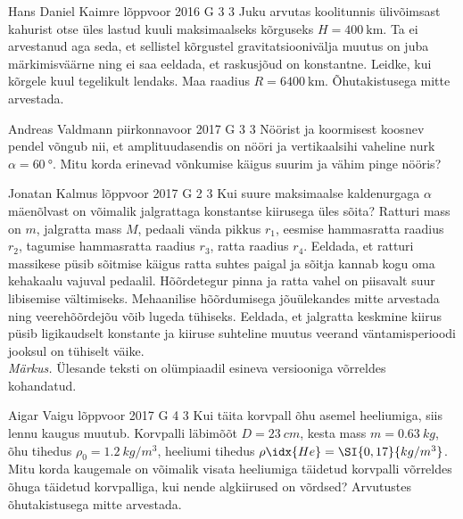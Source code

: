 \documentclass[11pt, twoside]{article}
\begin{document}
{%
{Hans Daniel Kaimre} %
{lõppvoor} %
{2016} %
{G 3} %
{3} %
{
\ifStatement
Juku arvutas koolitunnis ülivõimsast kahurist otse üles lastud kuuli maksimaalseks kõrguseks $H=\SI{400}{\km}$. Ta ei arvestanud aga seda, et sellistel kõrgustel gravitatsioonivälja muutus on juba märkimisväärne ning ei saa eeldada, et raskusjõud on konstantne. Leidke, kui kõrgele kuul tegelikult lendaks. Maa raadius $R=\SI{6400}{\km}$. Õhutakistusega mitte arvestada.
\fi
}

{Andreas Valdmann} %
{piirkonnavoor} %
{2017} %
{G 3} %
{3} %
{
\ifStatement
Nöörist ja koormisest koosnev pendel võngub nii, et amplituudasendis on nööri ja vertikaalsihi vaheline nurk $\alpha=\SI{60}{\degree}$. Mitu korda erinevad võnkumise käigus suurim ja vähim pinge nööris?
\fi
}

{Jonatan Kalmus} %
{lõppvoor} %
{2017} %
{G 2} %
{3} %
{
\ifStatement
Kui suure maksimaalse kaldenurgaga $\alpha$ mäenõlvast on võimalik jalgrattaga konstantse kiirusega üles sõita? Ratturi mass on $m$, jalgratta mass $M$, pedaali vända pikkus $r_1$, eesmise hammasratta raadius $r_2$, tagumise hammasratta raadius $r_3$, ratta raadius $r_4$. Eeldada, et ratturi massikese püsib sõitmise käigus ratta suhtes paigal ja sõitja kannab kogu oma kehakaalu vajuval pedaalil. Hõõrdetegur pinna ja ratta vahel on piisavalt suur libisemise vältimiseks. Mehaanilise hõõrdumisega jõuülekandes mitte arvestada ning veerehõõrdejõu võib lugeda tühiseks. Eeldada, et jalgratta keskmine kiirus püsib ligikaudselt konstante ja kiiruse suhteline muutus veerand väntamisperioodi jooksul on tühiselt väike.\\
\emph{Märkus.} Ülesande teksti on olümpiaadil esineva versiooniga võrreldes kohandatud.
\fi
}

{Aigar Vaigu} %
{lõppvoor} %
{2017} %
{G 4} %
{3} %
{
\ifStatement
Kui täita korvpall õhu asemel heeliumiga, siis lennu kaugus muutub. Korvpalli läbimõõt $D=\SI{23}{cm}$, kesta mass $m=\SI{0,63}{kg}$, õhu tihedus $\rho_0=\SI{1,2}{kg/m^3}$, heeliumi tihedus $\rho\idx{He}=\SI{0,17}{kg/m^3}$. 
Mitu korda kaugemale on võimalik visata heeliumiga täidetud korvpalli võrreldes õhuga täidetud korvpalliga, kui nende algkiirused on võrdsed? Arvutustes õhutakistusega mitte arvestada.
\fi
}

}
\end{document}
